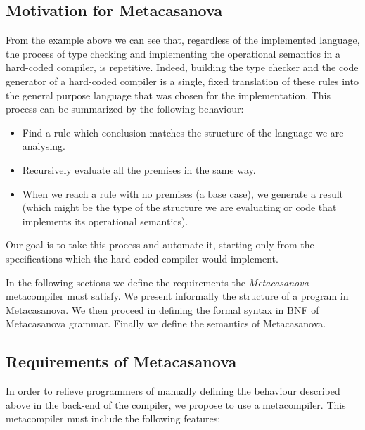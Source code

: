 \subsection{Motivation for Metacasanova}

From the example above we can see that, regardless of the implemented language, the process of type checking and implementing the operational semantics in a hard-coded compiler, is repetitive. Indeed, building the type checker and the code generator of a hard-coded compiler is a single, fixed translation of these rules into the general purpose language that was chosen for the implementation. This process can be summarized by the following behaviour:

\begin{itemize}
	\item Find a rule which conclusion matches the structure of the language we are analysing.
	\item Recursively evaluate all the premises in the same way.
	\item When we reach a rule with no premises (a base case), we generate a result (which might be the type of the structure we are evaluating or code that implements its operational semantics).
\end{itemize}

Our goal is to take this process and automate it, starting only from the specifications which the hard-coded compiler would implement.

In the following sections we define the requirements the \textit{Metacasanova} metacompiler must satisfy. We present informally the structure of a program in Metacasanova. We then proceed in defining the formal syntax in BNF of Metacasanova grammar. Finally we define the semantics of Metacasanova.

\subsection{Requirements of Metacasanova}
In order to relieve programmers of manually defining the behaviour described above in the back-end of the compiler, we propose to use a metacompiler. This metacompiler must include the following features:

